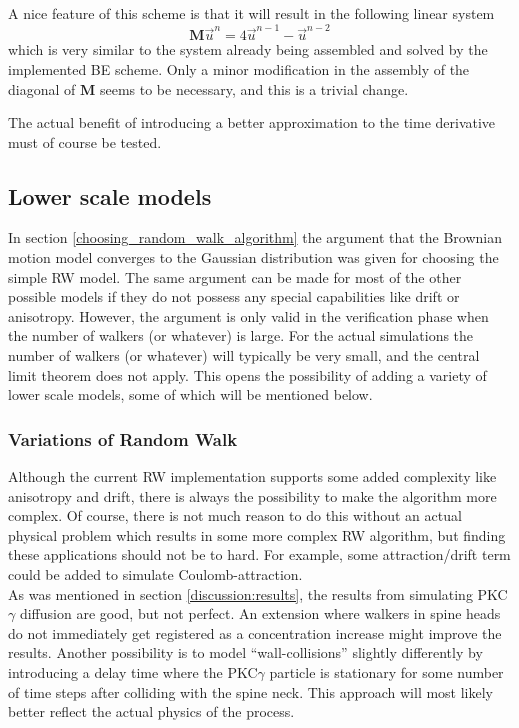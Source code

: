 A nice feature of this scheme is that it will result in the following linear system
\begin{equation*}
 \mathbf M\vec{u}^n = 4\vec{u}^{n-1}-\vec{u}^{n-2}
\end{equation*}
which is very similar to the system already being assembled and solved by the implemented BE scheme. 
Only a minor modification in the assembly of the diagonal of $\mathbf M$ seems to be necessary, and this is a trivial change.


The actual benefit of introducing a better approximation to the time derivative must of course be tested. 

\subsection{Lower scale models}
In section \ref{choosing_random_walk_algorithm} the argument that the Brownian motion model converges to the Gaussian distribution was given for choosing the simple RW model. 
The same argument can be made for most of the other possible models if they do not possess any special capabilities like drift or anisotropy. 
However, the argument is only valid in the verification phase when the number of walkers (or whatever) is large. 
For the actual simulations the number of walkers (or whatever) will typically be very small, and the central limit theorem does not apply. 
This opens the possibility of adding a variety of lower scale models, some of which will be mentioned below.

\subsubsection{Variations of Random Walk}
Although the current RW implementation supports some added complexity like anisotropy and drift, there is always the possibility to make the algorithm more complex. 
Of course, there is not much reason to do this without an actual physical problem which results in some more complex RW algorithm, but finding these applications should not be to hard. 
For example, some attraction/drift term could be added to simulate Coulomb-attraction.\\
As was mentioned in section \ref{discussion:results}, the results from simulating PKC$\gamma$ diffusion are good, but not perfect. 
An extension where walkers in spine heads do not immediately get registered as a concentration increase might improve the results. 
Another possibility is to model ``wall-collisions'' slightly differently by introducing a delay time where the PKC$\gamma$ particle is stationary for some number of time steps after colliding with the spine neck. 
This approach will most likely better reflect the actual physics of the process.


